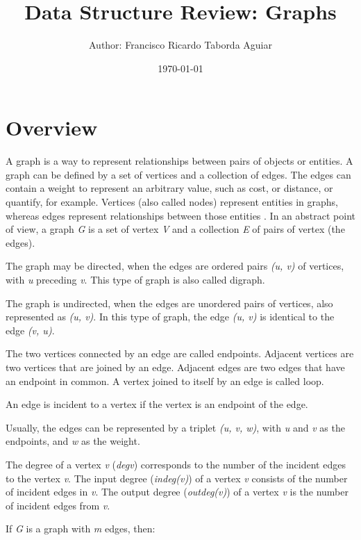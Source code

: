 \documentclass[a4paper]{article}
\title{
    Data Structure Review: Graphs\\
}
\author{
    \small{Author: Francisco Ricardo Taborda Aguiar}\\
}
\date{\today}
\begin{document}
    \maketitle


    \section{Overview}

    A graph is a way to represent relationships between pairs
    of objects \cite{goodrich:2014} or entities.
    A graph can be defined by a set of vertices and a collection
    of edges. The edges can contain a weight to represent an
    arbitrary value, such as cost, or distance, or quantify,
    for example.
    Vertices (also called nodes) represent entities in graphs,
    whereas edges represent
    relationships between those entities \cite{xia:2021}.
    In an abstract point of view, a graph \emph{G} is a set of vertex
    \emph{V} and a collection \emph{E} of pairs of vertex (the edges).

    The graph may be directed, when the edges are ordered pairs
    \emph{(u, v)} of vertices, with \emph{u} preceding \emph{v}.
    This type of graph is also called digraph.

    The graph is undirected, when the edges are unordered pairs of
    vertices, also represented as \emph{(u, v)}. In this type of
    graph, the edge \emph{(u, v)} is identical to the edge
    \emph{(v, u)}.

    The two vertices connected by an edge are called endpoints.
    Adjacent vertices are two vertices that are joined by an edge.
    Adjacent edges are two edges that have an endpoint in common.
    A vertex joined to itself by an edge is called loop.

    An edge is incident to a vertex if the vertex is an endpoint of
    the edge.

    Usually, the edges can be represented by a triplet
    \emph{(u, v, w)}, with \emph{u} and \emph{v} as
    the endpoints, and \emph{w} as the weight.

    The degree of a vertex \emph{v} (\emph{deg{v}}) corresponds to
    the number of the incident edges to the vertex \emph{v}.
    The input degree (\emph{indeg(v)}) of a vertex \emph{v} consists
    of the number of incident edges in \emph{v}.
    The output degree (\emph{outdeg(v)}) of a vertex \emph{v} is the
    number of incident edges from \emph{v}.

    If \emph{G} is a graph with \emph{m} edges, then:
\end{document}
